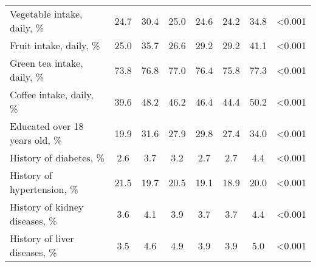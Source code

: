 \documentclass[nutrients,article,submit,moreauthors,pdftex]{mdpi}
\begin{document}
\begin{table}[H]
\begin{tabular}[t]{lccccccc}
\hspace{1em}Vegetable intake, daily, \% & 24.7 & 30.4 & 25.0 & 24.6 & 24.2 & 34.8 & <0.001\\
\rowcolor{gray!6}  \hspace{1em}Fruit intake, daily, \% & 25.0 & 35.7 & 26.6 & 29.2 & 29.2 & 41.1 & <0.001\\
\hspace{1em}Green tea intake, daily, \% & 73.8 & 76.8 & 77.0 & 76.4 & 75.8 & 77.3 & <0.001\\
\rowcolor{gray!6}  \hspace{1em}Coffee intake, daily, \% & 39.6 & 48.2 & 46.2 & 46.4 & 44.4 & 50.2 & <0.001\\
\hspace{1em}Educated over 18 years old, \% & 19.9 & 31.6 & 27.9 & 29.8 & 27.4 & 34.0 & <0.001\\
\rowcolor{gray!6}  \hspace{1em}History of diabetes, \% & 2.6 & 3.7 & 3.2 & 2.7 & 2.7 & 4.4 & <0.001\\
\hspace{1em}History of hypertension, \% & 21.5 & 19.7 & 20.5 & 19.1 & 18.9 & 20.0 & <0.001\\
\rowcolor{gray!6}  \hspace{1em}History of kidney diseases, \% & 3.6 & 4.1 & 3.9 & 3.7 & 3.7 & 4.4 & <0.001\\
\hspace{1em}History of liver diseases, \% & 3.5 & 4.6 & 4.9 & 3.9 & 3.9 & 5.0 & <0.001\\
\bottomrule
\end{tabular}
\end{table}
\end{document}
